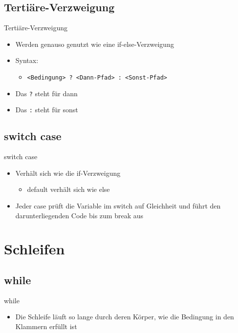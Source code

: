 \subsection{Tertiäre-Verzweigung}
\begin{frame}{Tertiäre-Verzweigung}
	\begin{itemize}
		\item Werden genauso genutzt wie eine if-else-Verzweigung
		\item Syntax:
		\begin{itemize}
			\item \alert{\texttt{<Bedingung> ? <Dann-Pfad> : <Sonst-Pfad>}}
		\end{itemize}
		\item Das \alert{\texttt{?}} steht für \alert{dann}
		\item Das \alert{\texttt{:}} steht für \alert{sonst}
	\end{itemize}		
	
\end{frame}

\subsection{switch case}
\begin{frame}{switch case}
	\begin{itemize}
		\item Verhält sich wie die if-Verzweigung
		\begin{itemize}
			\item \alert{default} verhält sich wie \alert{else}
		\end{itemize}
		\item Jeder \alert{case} prüft die Variable im \alert{switch} auf Gleichheit und führt den darunterliegenden Code bis zum \alert{break} aus
	\end{itemize}
	
\end{frame}

\section{Schleifen}
\subsection{while}
\begin{frame}{while}
	\begin{itemize}
		\item Die Schleife läuft so lange durch deren Körper, wie die Bedingung in den Klammern erfüllt ist
	\end{itemize}
		
\end{frame}

